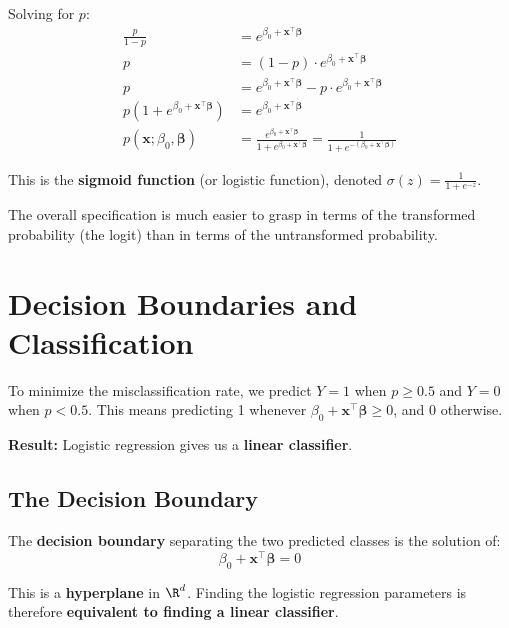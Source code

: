\documentclass[main.tex]{subfiles}
\begin{document}
Solving for $p$:
\begin{align}
\frac{p}{1-p} &= e^{\beta_0 + \mathbf{x}^\top \boldsymbol{\beta}} \\[8pt]
p &= (1-p) \cdot e^{\beta_0 + \mathbf{x}^\top \boldsymbol{\beta}} \\[8pt]
p &= e^{\beta_0 + \mathbf{x}^\top \boldsymbol{\beta}} - p \cdot e^{\beta_0 + \mathbf{x}^\top \boldsymbol{\beta}} \\[8pt]
p\left(1 + e^{\beta_0 + \mathbf{x}^\top \boldsymbol{\beta}}\right) &= e^{\beta_0 + \mathbf{x}^\top \boldsymbol{\beta}} \\[8pt]
p(\mathbf{x}; \beta_0, \boldsymbol{\beta}) &= \frac{e^{\beta_0 + \mathbf{x}^\top \boldsymbol{\beta}}}{1 + e^{\beta_0 + \mathbf{x}^\top \boldsymbol{\beta}}} = \frac{1}{1 + e^{-(\beta_0 + \mathbf{x}^\top \boldsymbol{\beta})}}
\end{align}

This is the \textbf{sigmoid function} (or logistic function), denoted $\sigma(z) = \frac{1}{1 + e^{-z}}$.

\begin{remark}
The overall specification is much easier to grasp in terms of the transformed probability (the logit) than in terms of the untransformed probability.
\end{remark}

\section{Decision Boundaries and Classification}

To minimize the misclassification rate, we predict $Y = 1$ when $p \geq 0.5$ and $Y = 0$ when $p < 0.5$. This means predicting 1 whenever $\beta_0 + \mathbf{x}^\top \boldsymbol{\beta} \geq 0$, and 0 otherwise.

\textbf{Result:} Logistic regression gives us a \textbf{linear classifier}.

\subsection{The Decision Boundary}

The \textbf{decision boundary} separating the two predicted classes is the solution of:
$$\beta_0 + \mathbf{x}^\top \boldsymbol{\beta} = 0$$

This is a \textbf{hyperplane} in $\R^d$. Finding the logistic regression parameters is therefore \textbf{equivalent to finding a linear classifier}.
\end{document}
